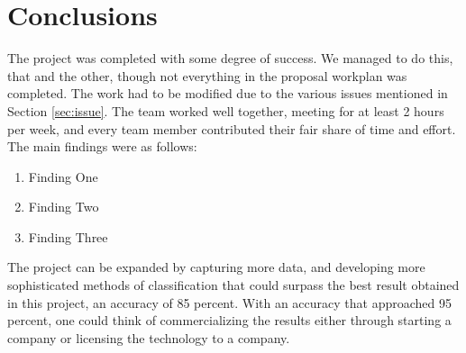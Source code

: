 \documentclass[12pt,a4paper]{article}
\begin{document}
	\section{Conclusions}
	The project was completed with some degree of success. We managed to do this, that and the other, though not everything in the proposal workplan was completed. The work had to be modified due to the various issues mentioned in Section \ref{sec:issue}. The team worked well together, meeting for at least 2 hours per week, and every team member contributed their fair share of time and effort. The main findings were as follows:
	\begin{enumerate}
		\item Finding One
		\item Finding Two
		\item Finding Three
	\end{enumerate}

	The project can be expanded by capturing more data, and developing more sophisticated methods of classification that could surpass the best result obtained in this project, an accuracy of 85 percent. With an accuracy that approached 95 percent, one could think of commercializing the results either through starting a company or licensing the technology to a company.
		
	
	
	
	
	
\end{document}
